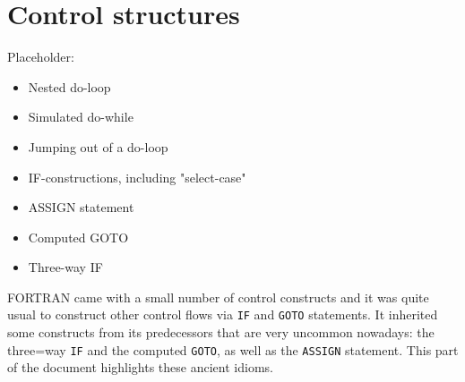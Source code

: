 \section{Control structures}
Placeholder:
\begin{itemize}
\item
Nested do-loop
\item
Simulated do-while
\item
Jumping out of a do-loop
\item
IF-constructions, including "select-case"
\item
ASSIGN statement
\item
Computed GOTO
\item
Three-way IF
\end{itemize}

FORTRAN came with a small number of control constructs and it was quite usual to construct
other control flows via \verb+IF+ and \verb+GOTO+ statements. It inherited some constructs
from its predecessors that are very uncommon nowadays: the three=way \verb+IF+ and the
computed \verb+GOTO+, as well as the \verb+ASSIGN+ statement. This part of the document
highlights these ancient idioms.

